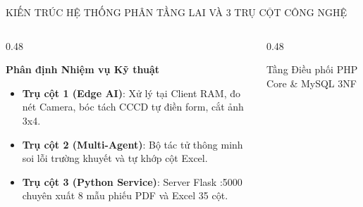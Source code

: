 \documentclass[aspectratio=169, 10pt]{beamer}
\begin{document}
\begin{frame}{KIẾN TRÚC HỆ THỐNG PHÂN TẦNG LAI VÀ 3 TRỤ CỘT CÔNG NGHỆ}
  \begin{center}
  \end{center}
  \vspace{-0.2cm}
  \begin{columns}[T]
    \begin{column}{0.48\textwidth}
      \begin{infoCard}
        \textbf{\color{DarkRed}Phân định Nhiệm vụ Kỹ thuật}
        \fontsize{6.8pt}{8.5pt}\selectfont
        \begin{itemize}
          \setlength{\itemsep}{1.5pt}
          \item \textbf{Trụ cột 1 (Edge AI)}: Xử lý tại Client RAM, đo nét Camera, bóc tách CCCD tự điền form, cắt ảnh 3x4.
          \item \textbf{Trụ cột 2 (Multi-Agent)}: Bộ tác tử thông minh soi lỗi trường khuyết và tự khớp cột Excel.
          \item \textbf{Trụ cột 3 (Python Service)}: Server Flask :5000 chuyên xuất 8 mẫu phiếu PDF và Excel 35 cột.
        \end{itemize}
      \end{infoCard}
    \end{column}
    \begin{column}{0.48\textwidth}
      \begin{greenCard}{Tầng Điều phối PHP Core \& MySQL 3NF}
        \fontsize{6.8pt}{8.5pt}\selectfont
        \begin{itemize}
          \setlength{\itemsep}{1.5pt}

\end{itemize}
\end{greenCard}
\end{column}
\end{columns}
\end{frame}
\end{document}
